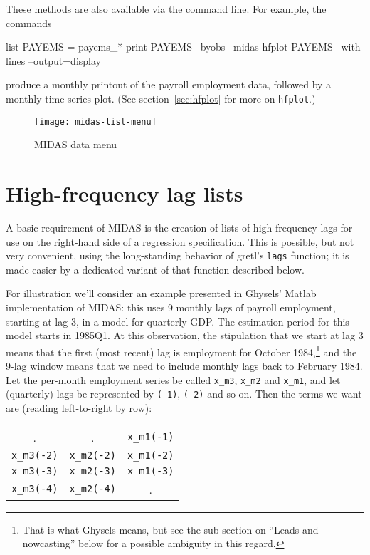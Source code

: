 \documentclass{article}
\begin{document}
These methods are also available via the command line. For example,
the commands
%
\begin{code}
list PAYEMS = payems_*
print PAYEMS --byobs --midas
hfplot PAYEMS --with-lines --output=display
\end{code}
%
produce a monthly printout of the payroll employment data, followed by
a monthly time-series plot. (See section~\ref{sec:hfplot} for more on
\texttt{hfplot}.)

\begin{figure}[htbp]
  \centering
  \texttt{[image: midas-list-menu]}
  \caption{MIDAS data menu}
  \label{fig:data-menu}
\end{figure}


\section{High-frequency lag lists}
\label{sec:hflags}

A basic requirement of MIDAS is the creation of lists of
high-frequency lags for use on the right-hand side of a regression
specification. This is possible, but not very convenient, using the
long-standing behavior of gretl's \texttt{lags} function; it is made
easier by a dedicated variant of that function described below.

For illustration we'll consider an example presented in Ghysels'
\textsf{Matlab} implementation of MIDAS: this uses 9 monthly lags of
payroll employment, starting at lag 3, in a model for quarterly GDP.
The estimation period for this model starts in 1985Q1. At this
observation, the stipulation that we start at lag 3 means that the
first (most recent) lag is employment for October 1984,\footnote{That
  is what Ghysels means, but see the sub-section on ``Leads and
  nowcasting'' below for a possible ambiguity in this regard.} and the
9-lag window means that we need to include monthly lags back to
February 1984. Let the per-month employment series be called
\texttt{x\_m3}, \texttt{x\_m2} and \texttt{x\_m1}, and let (quarterly)
lags be represented by \texttt{(-1)}, \texttt{(-2)} and so on. Then
the terms we want are (reading left-to-right by row):
\begin{center}
{\small
\begin{tabular}{ccc}
 . & . & \texttt{x\_m1(-1)} \\
\texttt{x\_m3(-2)} & \texttt{x\_m2(-2)} & \texttt{x\_m1(-2)} \\
\texttt{x\_m3(-3)} & \texttt{x\_m2(-3)} & \texttt{x\_m1(-3)} \\
\texttt{x\_m3(-4)} & \texttt{x\_m2(-4)} & .
\end{tabular}
}
\end{center}
\end{document}
